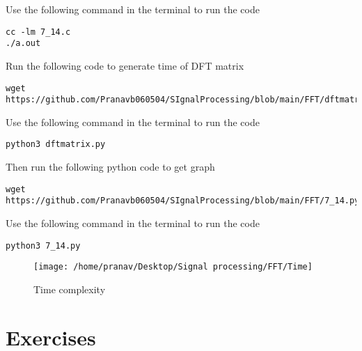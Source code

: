 \documentclass[journal,12pt,twocolumn]{IEEEtran}
\renewcommand\thesection{\arabic{section}}
\begin{document}
\begin{enumerate}[label=\arabic*.,ref=\thesection.\theenumi]
\begin{lstlisting}
\end{lstlisting}
Use the following command in the terminal to run the code
\begin{lstlisting}
cc -lm 7_14.c
./a.out
\end{lstlisting}
Run the following code to generate time of DFT matrix
\begin{lstlisting}
wget https://github.com/Pranavb060504/SIgnalProcessing/blob/main/FFT/dftmatrix.py
\end{lstlisting}
Use the following command in the terminal to run the code
\begin{lstlisting}
python3 dftmatrix.py
\end{lstlisting}
Then run the following python code to get graph
\begin{lstlisting}
wget https://github.com/Pranavb060504/SIgnalProcessing/blob/main/FFT/7_14.py
\end{lstlisting}
Use the following command in the terminal to run the code
\begin{lstlisting}
python3 7_14.py
\end{lstlisting}
\begin{figure}[!ht]
\centering
\texttt{[image: /home/pranav/Desktop/Signal processing/FFT/Time]}
\caption{Time complexity}
\label{fig:time}
\end{figure}
 \end{enumerate}
%
 \section{Exercises}
\end{document}
